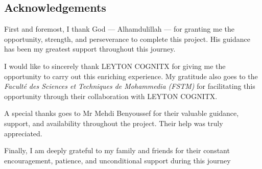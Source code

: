 \documentclass[12pt,a4paper]{report}
\begin{document}
\begin{center}
    \chapter*{\centering Acknowledgements}
First and foremost, I thank God — Alhamdulillah — for granting me the opportunity, strength, and perseverance to complete this project. His guidance has been my greatest support throughout this journey.

\vspace{1em}

I would like to sincerely thank LEYTON COGNITX for giving me the opportunity to carry out this enriching experience. My gratitude also goes to the \textit{Faculté des Sciences et Techniques de Mohammedia (FSTM)} for facilitating this opportunity through their collaboration with LEYTON COGNITX.

\vspace{1em}

A special thanks goes to Mr Mehdi Benyoussef for their valuable guidance, support, and availability throughout the project. Their help was truly appreciated.

\vspace{1em}

Finally, I am deeply grateful to my family and friends for their constant encouragement, patience, and unconditional support during this journey
\end{center}
\newpage





\end{document}
